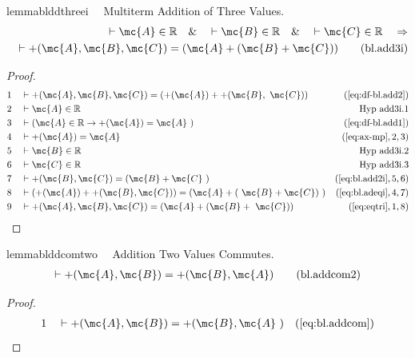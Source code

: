 \begin{restatable}{lemma}{blddthreei}~~ Multiterm Addition of Three Values.
\begin{align}
\vdash \mc{A} \in \mathbb{R}\quad\&\quad \vdash \mc{B} \in
    \mathbb{R}\quad\&\quad \vdash \mc{C} \in \mathbb{R}\quad\Rightarrow \notag \\ 
	\quad
    \vdash +( \mc{A} , \mc{B} , \mc{C} ) = ( \mc{A} + ( \mc{B} + \mc{C} )
    )\label{eq:bl.add3i}\tag{bl.add3i}
\end{align}
\end{restatable}

\begin{proof}
\begin{align}
  1 &&  & \vdash +( \mc{A} , \mc{B} , \mc{C} ) = ( +( \mc{A} ) + +( \mc{B} ,
     ~\mc{C} ) )&(\mbox{\ref{eq:df-bl.add2}})\notag
  \\ 2 &&  & \vdash \mc{A} \in \mathbb{R}&\text{Hyp~add3i.1}\notag%
  \\ 3 &&  & \vdash ( \mc{A} \in \mathbb{R} \rightarrow +( \mc{A} ) = \mc{A}
     ~)&(\mbox{\ref{eq:df-bl.add1}})\notag
  \\ 4 &&  & \vdash +( \mc{A} ) = \mc{A}&(\mbox{\ref{eq:ax-mp}},2,3)\notag
  \\ 5 &&  & \vdash \mc{B} \in \mathbb{R}&\text{Hyp~add3i.2}\notag%
  \\ 6 &&  & \vdash \mc{C} \in \mathbb{R}&\text{Hyp~add3i.3}\notag%
  \\ 7 &&  & \vdash +( \mc{B} , \mc{C} ) = ( \mc{B} + \mc{C}
     ~)&(\mbox{\ref{eq:bl.add2i}},5,6)\notag
  \\ 8 &&  & \vdash ( +( \mc{A} ) + +( \mc{B} , \mc{C} ) ) = ( \mc{A} + (
     ~\mc{B} + \mc{C} )
     ~)&(\mbox{\ref{eq:bl.adeqi}},4,7)\notag
  \\ 9 &&  & \vdash +( \mc{A} , \mc{B} , \mc{C} ) = ( \mc{A} + ( \mc{B} +
     ~\mc{C} ) )&(\mbox{\ref{eq:eqtri}},1,8)\notag
\end{align}
\end{proof}

\begin{restatable}{lemma}{blddcomtwo}~~ Addition Two Values Commutes.
\begin{align}
\vdash +( \mc{A} , \mc{B} ) = +( \mc{B} , \mc{A}
    )\label{eq:bl.addcom2}\tag{bl.addcom2}
\end{align}
\end{restatable}

\begin{proof}
\begin{align}
  1 &&  & \vdash +( \mc{A} , \mc{B} ) = +( \mc{B} , \mc{A}
     ~)&(\mbox{\ref{eq:bl.addcom}})\notag
\end{align}
\end{proof}

